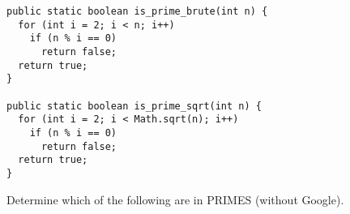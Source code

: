 \documentclass[addpoints,12pt]{exam}
\begin{document}
\begin{questions}
  \begin{solution}
    \begin{verbatim}
public static boolean is_prime_brute(int n) {
  for (int i = 2; i < n; i++)
    if (n % i == 0)
      return false;
  return true;
}

public static boolean is_prime_sqrt(int n) {
  for (int i = 2; i < Math.sqrt(n); i++)
    if (n % i == 0)
      return false;
  return true;
}
    \end{verbatim}
  \end{solution}


\question
  Determine which of the following are in PRIMES (without Google).
  \begin{solution}
\end{solution}
\end{questions}
\end{document}

